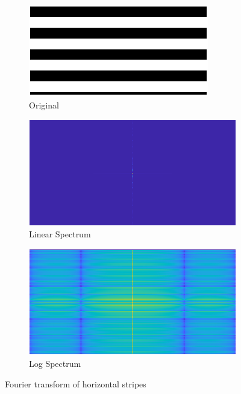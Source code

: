\begin{figure}[!ht]
    \centering
    \begin{subfigure}{0.32\textwidth}
        \centering
        \includegraphics[width=\textwidth]{Doc/Graphics/Part1/Q3_hstripes.png}
        \caption{Original}
    \end{subfigure}
    \hfill
    \begin{subfigure}{0.32\textwidth}
        \centering
        \includegraphics[width=\textwidth]{Doc/Graphics/Part1/Q13_Horizontal stripes.png}
        \caption{Linear Spectrum}
    \end{subfigure}
    \hfill
    \begin{subfigure}{0.32\textwidth}
        \centering
        \includegraphics[width=\textwidth]{Doc/Graphics/Part1/Q13_log_Horizontal stripes.png}
        \caption{Log Spectrum}
    \end{subfigure}
    \caption{Fourier transform of horizontal stripes}
\end{figure}
